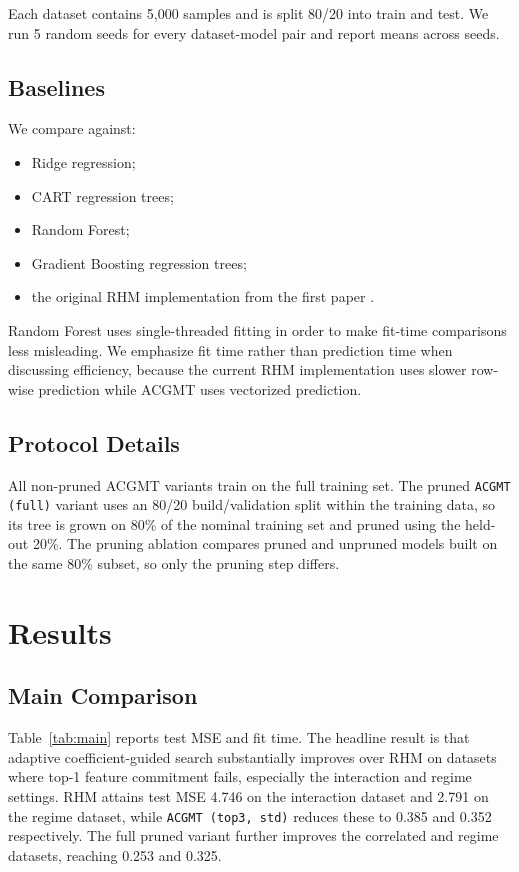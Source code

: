 \documentclass[11pt,a4paper]{article}
\begin{document}
Each dataset contains 5{,}000 samples and is split 80/20 into train and test. We run 5 random seeds for every dataset-model pair and report means across seeds.

\subsection{Baselines}

We compare against:
\begin{itemize}
    \item Ridge regression;
    \item CART regression trees;
    \item Random Forest;
    \item Gradient Boosting regression trees;
    \item the original RHM implementation from the first paper \citep{rhm2026}.
\end{itemize}

Random Forest uses single-threaded fitting in order to make fit-time comparisons less misleading. We emphasize fit time rather than prediction time when discussing efficiency, because the current RHM implementation uses slower row-wise prediction while ACGMT uses vectorized prediction.

\subsection{Protocol Details}

All non-pruned ACGMT variants train on the full training set. The pruned \texttt{ACGMT (full)} variant uses an 80/20 build/validation split within the training data, so its tree is grown on 80\% of the nominal training set and pruned using the held-out 20\%. The pruning ablation compares pruned and unpruned models built on the same 80\% subset, so only the pruning step differs.

\section{Results}\label{sec:results}

\subsection{Main Comparison}

Table~\ref{tab:main} reports test MSE and fit time. The headline result is that adaptive coefficient-guided search substantially improves over RHM on datasets where top-1 feature commitment fails, especially the interaction and regime settings. RHM attains test MSE 4.746 on the interaction dataset and 2.791 on the regime dataset, while \texttt{ACGMT (top3, std)} reduces these to 0.385 and 0.352 respectively. The full pruned variant further improves the correlated and regime datasets, reaching 0.253 and 0.325.
\end{document}
